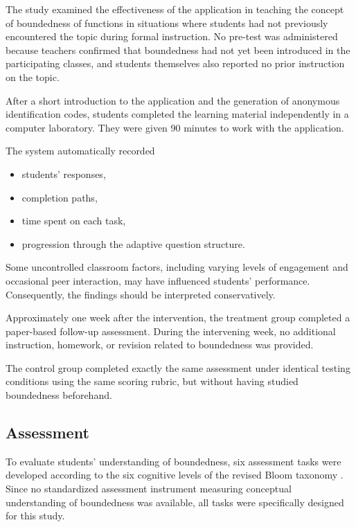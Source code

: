 \documentclass[11pt]{article}
\begin{document}
The study examined the effectiveness of the application in teaching the concept of boundedness of functions in situations where students had not previously encountered the topic during formal instruction. No pre-test was administered because teachers confirmed that boundedness had not yet been introduced in the participating classes, and students themselves also reported no prior instruction on the topic.

After a short introduction to the application and the generation of anonymous identification codes, students completed the learning material independently in a computer laboratory. They were given 90 minutes to work with the application.

The system automatically recorded

\begin{itemize}
\item students' responses,
\item completion paths,
\item time spent on each task,
\item progression through the adaptive question structure.
\end{itemize}

Some uncontrolled classroom factors, including varying levels of engagement and occasional peer interaction, may have influenced students' performance. Consequently, the findings should be interpreted conservatively.

Approximately one week after the intervention, the treatment group completed a paper-based follow-up assessment. During the intervening week, no additional instruction, homework, or revision related to boundedness was provided.

The control group completed exactly the same assessment under identical testing conditions using the same scoring rubric, but without having studied boundedness beforehand.


\subsection{Assessment}

To evaluate students' understanding of boundedness, six assessment tasks were developed according to the six cognitive levels of the revised Bloom taxonomy \citep{Anderson2001}. Since no standardized assessment instrument measuring conceptual understanding of boundedness was available, all tasks were specifically designed for this study.
\end{document}
